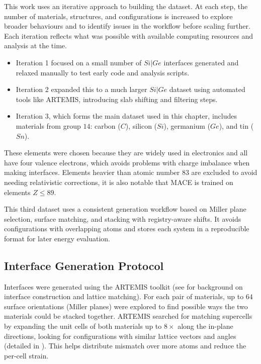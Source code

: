 This work uses an iterative approach to building the dataset.
At each step, the number of materials, structures, and configurations is increased to explore broader behaviours and to identify issues in the workflow before scaling further.
Each iteration reflects what was possible with available computing resources and analysis at the time.
\begin{itemize}
    \item Iteration 1 focused on a small number of $Si|Ge$ interfaces generated and relaxed manually to test early code and analysis scripts.
    \item Iteration 2 expanded this to a much larger $Si|Ge$ dataset using automated tools like ARTEMIS, introducing slab shifting and filtering steps.
    \item Iteration 3, which forms the main dataset used in this chapter, includes materials from group $14$: carbon ($C$), silicon ($Si$), germanium ($Ge$), and tin ($Sn$).
\end{itemize}
These elements were chosen because they are widely used in electronics and all have four valence electrons, which avoids problems with charge imbalance when making interfaces.
Elements heavier than atomic number 83 are excluded to avoid needing relativistic corrections, it is also notable that MACE is trained on elements $Z \le 89$.

This third dataset uses a consistent generation workflow based on Miller plane selection, surface matching, and stacking with registry-aware shifts.
It avoids configurations with overlapping atoms and stores each system in a reproducible format for later energy evaluation.

\subsection{Interface Generation Protocol}

Interfaces were generated using the ARTEMIS toolkit (see  for background on interface construction and lattice matching).
For each pair of materials, up to $64$ surface orientations (Miller planes) were explored to find possible ways the two materials could be stacked together.
ARTEMIS searched for matching supercells by expanding the unit cells of both materials up to $8 \times$ along the in-plane directions, looking for configurations with similar lattice vectors and angles (detailed in ).
This helps distribute mismatch over more atoms and reduce the per-cell strain\cite{artemis_paper}.

